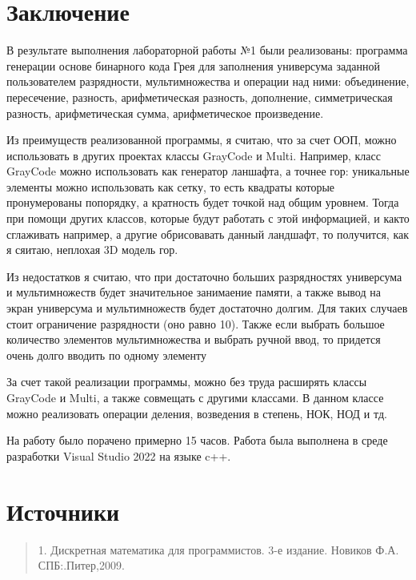 \documentclass[10pt,a4paper,final]{article} %
\begin{document}
\section* {Заключение}
\par В результате выполнения лабораторной работы №1 были реализованы: программа генерации основе бинарного кода Грея для заполнения универсума заданной пользователем разрядности, мультимножества и операции над ними: объединение, пересечение, разность, арифметическая разность, дополнение, симметрическая разность, арифметическая сумма, арифметическое произведение. 
\par Из преимуществ реализованной программы, я считаю, что за счет ООП, можно использовать в других проектах классы GrayCode и Multi. Например, класс GrayCode можно использовать как генератор ланшафта, а точнее гор: уникальные элементы можно использовать как сетку, то есть квадраты которые пронумерованы попорядку, а кратность будет точкой над общим уровнем. Тогда при помощи других классов, которые будут работать с этой информацией, и както сглаживать например, а другие обрисовавать данный ландшафт, то получится, как я сяитаю, неплохая 3D модель гор. 
\par Из недостатков я считаю, что при достаточно больших разрядностях универсума и мультимножеств будет значительное занимаение памяти, а также вывод на экран универсума и мультимножеств будет достаточно долгим. Для таких случаев стоит ограничение разрядности (оно равно 10). Также если выбрать большое количество элементов мультимножества и выбрать ручной ввод, то придется очень долго вводить по одному элементу   
\par За счет такой реализации программы, можно без труда расширять классы GrayCode и Multi, а также совмещать с другими классами. В данном классе можно реализовать операции деления, возведения в степень, НОК, НОД и тд. 
\par На работу было порачено примерно 15 часов. Работа была выполнена в среде разработки Visual Studio 2022 на языке c++.

\newpage
\section* {Источники}
\begin{quote}
	1. Дискретная математика для программистов. 3-е издание. Новиков Ф.А.
	СПБ:.Питер,2009.
\end{quote}
\end{document}
